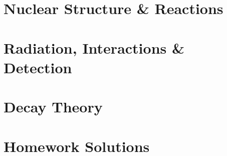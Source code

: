 \documentclass[12pt, a4paper]{article}
\begin{document}
\thispagestyle{empty}
\newpage
\tableofcontents
\newpage



\part{Nuclear Structure \& Reactions}

\newpage

\newpage

\newpage


\clearpage
\part{Radiation, Interactions \& Detection}

\newpage

\newpage


\clearpage
\part{Decay Theory}

\newpage

\newpage

\newpage




\clearpage
\part{Homework Solutions}

% 
\end{document}
